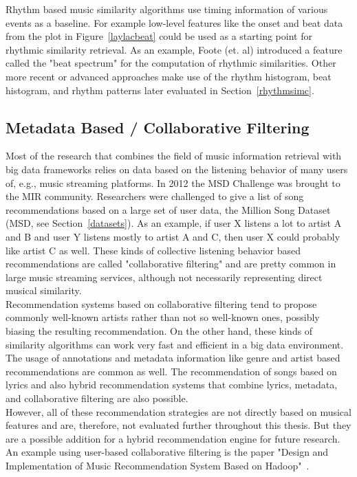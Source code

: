 Rhythm based music similarity algorithms use timing information of various events as a baseline. For example low-level features like the onset and beat data from the plot in Figure~\ref{laylacbeat} could be used as a starting point for rhythmic similarity retrieval. As an example, Foote (et. al) introduced a feature called the "beat spectrum" for the computation of rhythmic similarities. Other more recent or advanced approaches make use of the rhythm histogram, beat histogram, and rhythm patterns later evaluated in Section~\ref{rhythmsimc}.

\subsection{Metadata Based / Collaborative Filtering}\label{collaborative}

Most of the research that combines the field of music information retrieval with big data frameworks relies on data based on the listening behavior of many users of, e.g., music streaming platforms. In 2012 the MSD Challenge was brought to the MIR community. Researchers were challenged to give a list of song recommendations based on a large set of user data, the Million Song Dataset (MSD, see Section~\ref{datasets}). As an example, if user X listens a lot to artist A and B and user Y listens mostly to artist A and C, then user X could probably like artist C as well. These kinds of collective listening behavior based recommendations are called "collaborative filtering" and are pretty common in large music streaming services, although not necessarily representing direct musical similarity. \cite[p. 192f.]{knees1}\\
Recommendation systems based on collaborative filtering tend to propose commonly well-known artists rather than not so well-known ones, possibly biasing the resulting recommendation. On the other hand, these kinds of similarity algorithms can work very fast and efficient in a big data environment. The usage of annotations and metadata information like genre and artist based recommendations are common as well. The recommendation of songs based on lyrics and also hybrid recommendation systems that combine lyrics, metadata, and collaborative filtering are also possible.\\
However, all of these recommendation strategies are not directly based on musical features and are, therefore, not evaluated further throughout this thesis. But they are a possible addition for a hybrid recommendation engine for future research. 
An example using user-based collaborative filtering is the paper "Design and Implementation of Music Recommendation System Based on Hadoop"~\cite{metadat1}. 

